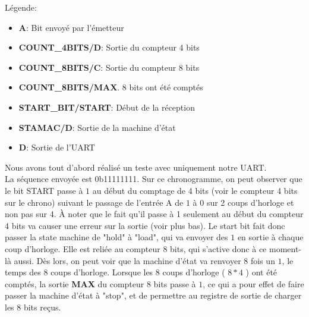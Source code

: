 \documentclass[a4paper]{article} %
\begin{document}
\begin{tcolorbox}[colframe=Monokaimagenta,colback=white]
\begin{figure}[H]
    \label{fig:countBase}
\end{figure}
Légende:
\begin{itemize}
    \item     \textbf{A}: Bit envoyé par l'émetteur
    \item     \textbf{COUNT\_4BITS/D}: Sortie du compteur 4 bits
    \item     \textbf{COUNT\_8BITS/C}: Sortie du compteur 8 bits
    \item     \textbf{COUNT\_8BITS/MAX}. 8 bits ont été comptés
    \item     \textbf{START\_BIT/START}: Début de la réception
    \item     \textbf{STAMAC/D}: Sortie de la machine d'état
    \item     \textbf{D}: Sortie de l'UART
\end{itemize}
Nous avons tout d'abord réalisé un teste avec uniquement notre UART.\\
La séquence envoyée est 0b11111111. Sur ce chronogramme, on peut observer que le bit START passe à $1$ au début du comptage de 4 bits (voir le compteur 4 bits sur le chrono) suivant le passage de l'entrée A de $1$ à $0$ sur 2 coups d'horloge et non pas sur 4. À noter que le fait qu'il passe à 1 seulement au début du compteur 4 bits va causer une erreur sur la sortie (voir plus bas).
Le start bit fait donc passer la state machine de "hold" à "load", qui va envoyer des $1$ en sortie à chaque coup d'horloge. Elle est reliée au compteur 8 bits, qui s'active donc à ce moment-là aussi. Dès lors, on peut voir que la machine d'état va renvoyer 8 fois un $1$, le temps des 8 coups d'horloge. Lorsque les 8 coups d'horloge ( $8*4$ ) ont été comptés, la sortie \textbf{MAX} du compteur 8 bits passe à $1$, ce qui a pour effet de faire passer la machine d'état à "stop", et de permettre au registre de sortie de charger les 8 bits reçus.
\end{tcolorbox}
\end{document}
